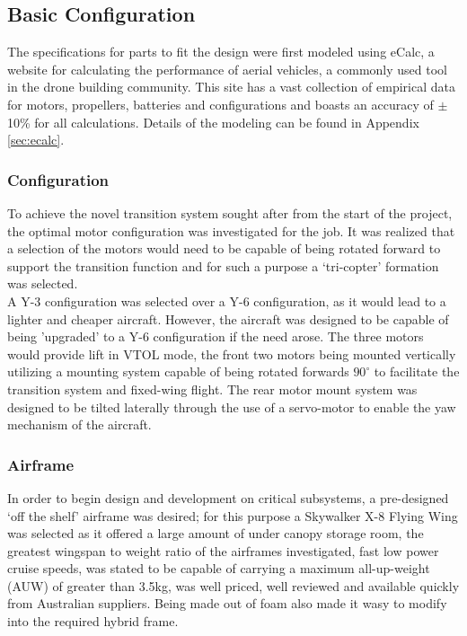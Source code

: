 
\subsection{Basic Configuration}
The specifications for parts to fit the design were first modeled using eCalc\cite{ref:ecalc}, a website for calculating the performance of aerial vehicles, a commonly used tool in the drone building community. This site has a vast collection of empirical data for motors, propellers, batteries and configurations and boasts an accuracy of $\pm$10\% for all calculations. Details of the modeling can be found in Appendix \ref{sec:ecalc}.

\subsubsection*{Configuration}
To achieve the novel transition system sought after from the start of the project, the optimal motor configuration was investigated for the job. It was realized that a selection of the motors would need to be capable of being rotated forward to support the transition function and for such a purpose a `tri-copter' formation was selected.\\
		
A Y-3 configuration was selected over a Y-6 configuration, as it would lead to a lighter and cheaper aircraft. However, the aircraft was designed to be capable of being 'upgraded' to a Y-6 configuration if the need arose. The three motors would provide lift in VTOL mode, the front two motors being mounted vertically utilizing a mounting system capable of being rotated forwards $90^{\circ}$ to facilitate the transition system and fixed-wing flight. The rear motor mount system was designed to be tilted laterally through the use of a servo-motor to enable the yaw mechanism of the aircraft.\\

\subsubsection*{Airframe}
In order to begin design and development on critical subsystems, a pre-designed `off the shelf' airframe was desired; for this purpose a Skywalker X-8 Flying Wing was selected as it offered a large amount of under canopy storage room, the greatest wingspan to weight ratio of the airframes investigated, fast low power cruise speeds, was stated to be capable of carrying a maximum all-up-weight (AUW) of greater than 3.5kg, was well priced, well reviewed and available quickly from Australian suppliers. Being made out of foam also made it wasy to modify into the required hybrid frame.
		
